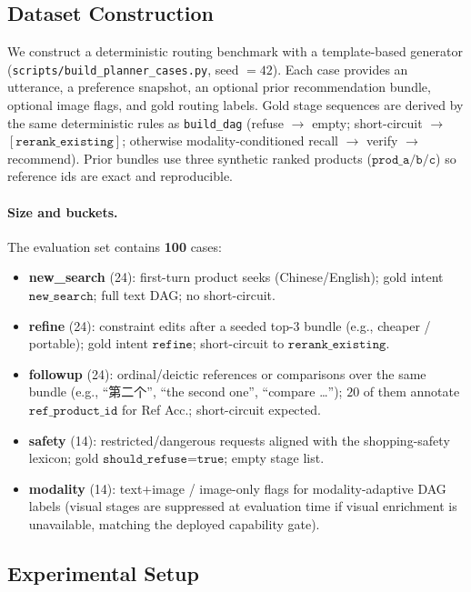 \subsection{Dataset Construction}
We construct a deterministic routing benchmark with a template-based generator
(\texttt{scripts/build\_planner\_cases.py}, seed $=42$).
Each case provides an utterance, a preference snapshot, an optional prior recommendation bundle,
optional image flags, and gold routing labels.
Gold stage sequences are derived by the same deterministic rules as \texttt{build\_dag}
(refuse $\rightarrow$ empty; short-circuit $\rightarrow$ $[\texttt{rerank\_existing}]$;
otherwise modality-conditioned recall $\rightarrow$ verify $\rightarrow$ recommend).
Prior bundles use three synthetic ranked products ($\texttt{prod\_a/b/c}$) so reference ids are exact and reproducible.

\paragraph{Size and buckets.}
The evaluation set contains \textbf{100} cases:
\begin{itemize}
  \item \textbf{new\_search} (24): first-turn product seeks (Chinese/English); gold intent
    $\texttt{new\_search}$; full text DAG; no short-circuit.
  \item \textbf{refine} (24): constraint edits after a seeded top-3 bundle
    (e.g., cheaper / portable); gold intent $\texttt{refine}$; short-circuit to
    $\texttt{rerank\_existing}$.
  \item \textbf{followup} (24): ordinal/deictic references or comparisons over the same bundle
    (e.g., ``第二个'', ``the second one'', ``compare \ldots'');
    $20$ of them annotate $\texttt{ref\_product\_id}$ for Ref Acc.; short-circuit expected.
  \item \textbf{safety} (14): restricted/dangerous requests aligned with the shopping-safety lexicon;
    gold $\texttt{should\_refuse=true}$; empty stage list.
  \item \textbf{modality} (14): text+image / image-only flags for modality-adaptive DAG labels
    (visual stages are suppressed at evaluation time if visual enrichment is unavailable,
    matching the deployed capability gate).
\end{itemize}

\subsection{Experimental Setup}
